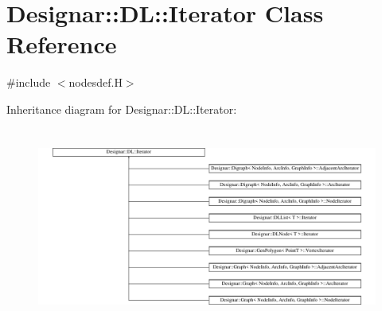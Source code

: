 \hypertarget{class_designar_1_1_d_l_1_1_iterator}{}\section{Designar\+:\+:DL\+:\+:Iterator Class Reference}
\label{class_designar_1_1_d_l_1_1_iterator}


{\ttfamily \#include $<$nodesdef.\+H$>$}

Inheritance diagram for Designar\+:\+:DL\+:\+:Iterator\+:\begin{figure}[H]
\begin{center}
\leavevmode
\includegraphics[height=6.511628cm]{class_designar_1_1_d_l_1_1_iterator}
\end{center}
\end{figure}
